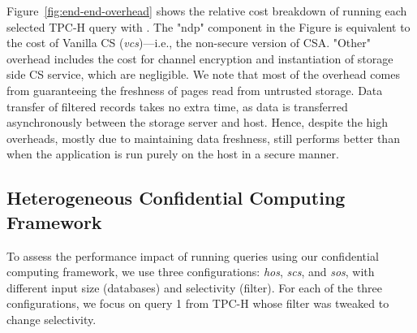 Figure~\ref{fig:end-end-overhead} shows the relative cost breakdown of running each selected TPC-H query with \project{}. The "ndp" component in the Figure is equivalent to the cost of Vanilla CS (\emph{vcs})---i.e., the non-secure version of CSA. "Other" overhead includes the cost for channel encryption and instantiation of storage side CS service, which are negligible.
%
We note that most of the overhead comes from guaranteeing the freshness of pages read from untrusted storage. Data transfer of filtered records takes no extra time, as data is transferred asynchronously between the storage server and host. Hence, despite the high overheads, mostly due to maintaining data freshness, \project{} still performs better than when the application is run purely on the host in a secure manner.



\subsection{Heterogeneous Confidential Computing Framework}
\label{subsec:hetro-tee-eval}

To assess the performance impact of running queries using our confidential computing framework, we use three configurations: \emph{hos}, \emph{scs}, and \emph{sos}, with different input size (databases) and selectivity (filter). 
For each of the three configurations, we focus on query 1 from TPC-H whose filter was tweaked to change selectivity.%

